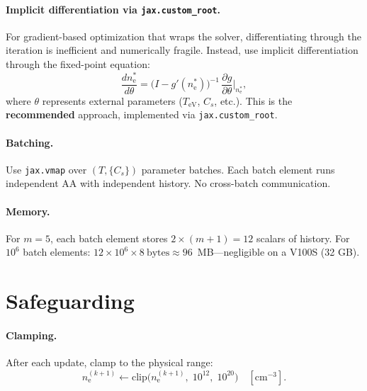 \documentclass[11pt]{article}
\newcommand{\ne}{n_\mathrm{e}}
\newcommand{\TeV}{T_\mathrm{eV}}
\begin{document}
\paragraph{Implicit differentiation via \texttt{jax.custom\_root}.}
For gradient-based optimization that wraps the solver, differentiating
through the iteration is inefficient and numerically fragile.  Instead,
use implicit differentiation through the fixed-point equation:
%
\begin{equation}
  \label{eq:implicit-diff}
  \frac{d\ne^*}{d\theta}
  = \bigl(I - g'(\ne^*)\bigr)^{-1}\,
    \frac{\partial g}{\partial \theta}\biggr|_{\ne^*},
\end{equation}
%
where $\theta$ represents external parameters ($\TeV$, $C_s$, etc.).
This is the \textbf{recommended} approach, implemented via
\texttt{jax.custom\_root}.


\paragraph{Batching.}
Use \texttt{jax.vmap} over $(T, \{C_s\})$ parameter batches.  Each batch
element runs independent AA with independent history.  No cross-batch
communication.

\paragraph{Memory.}
For $m = 5$, each batch element stores $2 \times (m+1) = 12$ scalars of
history.  For $10^6$ batch elements: $12 \times 10^6 \times 8~\text{bytes}
\approx 96$~MB---negligible on a V100S (32 GB).


\section{Safeguarding}
\label{sec:safeguarding}

\paragraph{Clamping.}
After each update, clamp to the physical range:
%
\begin{equation}
  \label{eq:clamp}
  \ne^{(k+1)} \leftarrow \mathrm{clip}\bigl(\ne^{(k+1)},\;
  10^{12},\; 10^{20}\bigr) \quad [\mathrm{cm}^{-3}].
\end{equation}
\end{document}
